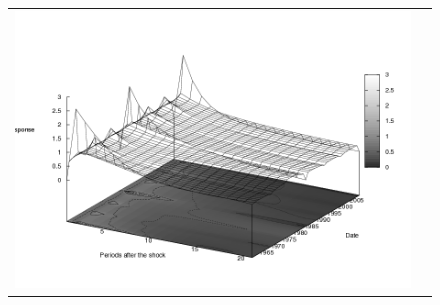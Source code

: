 \begin{figure}
\begin{tabular}{cc}
\includegraphics[scale=0.25]{results_wlsinit/Inflation_costshock_irf3d.png} \\ 
\end{tabular}
\end{figure}
